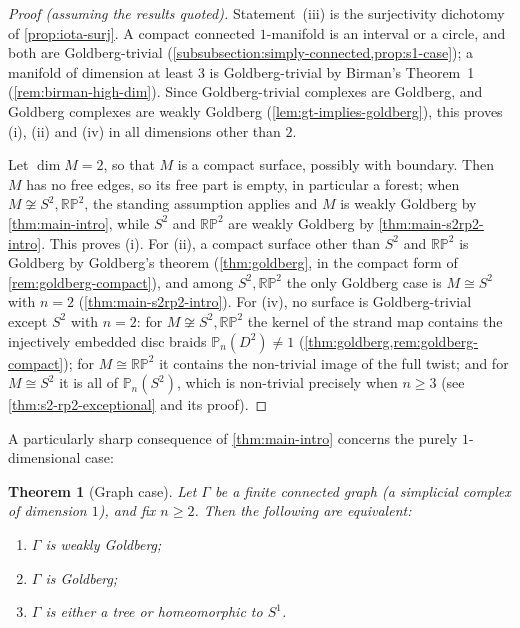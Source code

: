 \documentclass[reqno]{amsart}
\newtheorem{theorem}{Theorem}[section]
\theoremstyle{definition}
\newcommand{\PB}{\mathbb{P}}
\newcommand{\RP}{\mathbb{RP}}
\numberwithin{equation}{section}
\begin{document}
\begin{proof}[Proof (assuming the results quoted)]
Statement~(iii) is the surjectivity dichotomy of
\cref{prop:iota-surj}. A compact connected \(1\)-manifold is an
interval or a circle, and both are Goldberg-trivial
(\cref{subsubsection:simply-connected,prop:s1-case}); a
manifold of dimension at least \(3\) is Goldberg-trivial by
Birman's Theorem~1~\cite[Thm.~1]{Birman1969}
(\cref{rem:birman-high-dim}). Since Goldberg-trivial complexes
are Goldberg, and Goldberg complexes are weakly Goldberg
(\cref{lem:gt-implies-goldberg}), this proves (i), (ii) and (iv) in
all dimensions other than \(2\).

Let \(\dim M=2\), so that \(M\) is a compact surface, possibly
with boundary. Then \(M\) has no free edges, so its free part is
empty, in particular a forest; when \(M\not\cong S^2,\RP^2\),
the standing assumption applies and \(M\) is weakly Goldberg by
\cref{thm:main-intro}, while \(S^2\) and \(\RP^2\) are weakly
Goldberg by \cref{thm:main-s2rp2-intro}. This proves (i). For
(ii), a compact surface other than \(S^2\) and \(\RP^2\) is
Goldberg by Goldberg's theorem (\cref{thm:goldberg}, in the
compact form of \cref{rem:goldberg-compact}), and among
\(S^2,\RP^2\) the only Goldberg case is \(M\cong S^2\) with
\(n=2\) (\cref{thm:main-s2rp2-intro}). For (iv), no surface is
Goldberg-trivial except \(S^2\) with \(n=2\): for
\(M\not\cong S^2,\RP^2\) the kernel of the strand map contains
the injectively embedded disc braids
\(\PB_n(D^2)\neq1\) (\cref{thm:goldberg,rem:goldberg-compact});
for \(M\cong\RP^2\) it contains the non-trivial image of the
full twist; and for \(M\cong S^2\) it is all of
\(\PB_n(S^2)\), which is non-trivial precisely when \(n\geq3\)
(see \cref{thm:s2-rp2-exceptional} and its proof).
\end{proof}

A particularly sharp consequence of \cref{thm:main-intro}
concerns the purely \(1\)-dimensional case:

\begin{theorem}[Graph case]\label{thm:graph-intro}
Let \(\Gamma\) be a finite connected graph (a simplicial complex
of dimension \(1\)), and fix \(n\ge 2\). Then the following are
equivalent:
\begin{enumerate}[label=\textup{(\roman*)},leftmargin=2em]
    \item \(\Gamma\) is weakly Goldberg;
    \item \(\Gamma\) is Goldberg;
    \item \(\Gamma\) is either a tree or homeomorphic to
          \(S^1\).
\end{enumerate}
\end{theorem}
\end{document}
